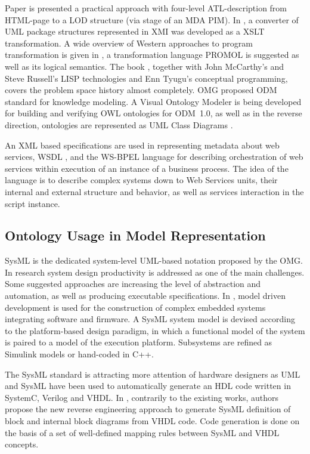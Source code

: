 \documentclass[12pt,a4paper]{llncs}
\begin{document}
Paper \cite{Malki} is presented a practical approach with four-level ATL-description from HTML-page to a LOD structure (via stage of an MDA PIM). In \cite{uml2owl}, a converter of UML package structures represented in XMI was developed as a XSLT transformation. A wide overview of Western approaches to program transformation is given in \cite{Dama,Dama2}, a transformation language PROMOL is suggested as well as its logical semantics. The book \cite{Dama}, together with John McCarthy's and Steve Russell's LISP technologies and Enn Tyugu's conceptual programming, covers the problem space history almost completely. OMG proposed ODM standard \cite{odmprof} for knowledge modeling.  A Visual Ontology Modeler \cite{odnext} is being developed for building and verifying OWL ontologies for ODM~1.0, as well as in the reverse direction, ontologies are represented as UML Class Diagrams \cite{odmvis}.

An XML based specifications are used in representing metadata about web services, WSDL \cite{wsdl}, and the WS-BPEL language \cite{wsbpel} for describing orchestration of web services within execution of an instance of a business process.  The idea of the language is to describe complex systems down to Web Services units, their internal and external structure and behavior, as well as services interaction in the script instance.

\subsection{Ontology Usage in Model Representation}
\label{sec:use-onto}

SysML is the dedicated system-level UML-based notation proposed by the OMG. In research \cite{raslan} system design productivity is addressed as one of the main challenges. Some suggested approaches are increasing the level of abstraction and automation, as well as producing executable specifications. In \cite{natale}, model driven development is used for the construction of complex embedded systems integrating software and firmware. A SysML system model is devised according to the platform-based design paradigm, in which a functional model of the system is paired to a model of the execution platform. Subsystems are refined as Simulink models or hand-coded in C++.

The SysML standard is attracting more attention of hardware designers as UML and SysML have been used to automatically generate an HDL code written in SystemC, Verilog and VHDL. In \cite{boute}, contrarily to the existing works, authors propose the new reverse engineering approach to generate SysML definition of block and internal block diagrams from VHDL code. Code generation is done on the basis of a set of well-defined mapping rules between SysML and VHDL concepts.
\end{document}
